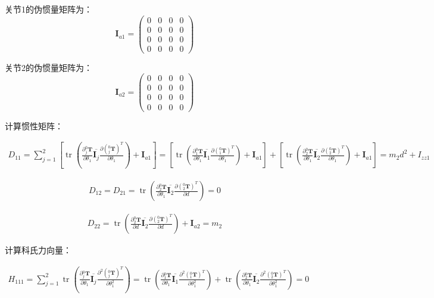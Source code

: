 \documentclass{homework}
\begin{document}
\begin{sol}
关节1的伪惯量矩阵为：
\[
  \mathbf{I}_{a1} = 
  \begin{pmatrix}
    0 & 0 & 0 & 0 \\
    0 & 0 & 0 & 0 \\
    0 & 0 & 0 & 0 \\
    0 & 0 & 0 & 0 
  \end{pmatrix}
\]

关节2的伪惯量矩阵为：
\[
  \mathbf{I}_{a2} = 
  \begin{pmatrix}
    0 & 0 & 0 & 0 \\
    0 & 0 & 0 & 0 \\
    0 & 0 & 0 & 0 \\
    0 & 0 & 0 & 0 
  \end{pmatrix}
\]

计算惯性矩阵：

\begin{align*}
  D_{11} = \sum_{j=1}^2 [\operatorname{tr} (\frac{\partial {^0_j}\mathbf{T}}{\partial \theta_1} \overline{\mathbf{I}_j} \frac{\partial ({^0_j}\mathbf{T})^T}{\partial \theta_1}) + \mathbf{I}_{a1}] 
         = [\operatorname{tr} (\frac{\partial {^0_1}\mathbf{T}}{\partial \theta_1} \overline{\mathbf{I}_1} \frac{\partial ({^0_1}\mathbf{T})^T}{\partial \theta_1}) + \mathbf{I}_{a1}] + [\operatorname{tr} (\frac{\partial {^0_2}\mathbf{T}}{\partial \theta_1} \overline{\mathbf{I}_2} \frac{\partial ({^0_2}\mathbf{T})^T}{\partial \theta_1}) + \mathbf{I}_{a1}] 
         = m_2 d^2 + I_{zz1}
\end{align*}

\begin{align*}
  D_{12} = D_{21} = \operatorname{tr} (\frac{\partial {^0_2}\mathbf{T}}{\partial \theta_1} \overline{\mathbf{I}_2} \frac{\partial ({^0_2}\mathbf{T})^T}{\partial d}) 
                  = 0
\end{align*}

\begin{align*}
  D_{22} = \operatorname{tr} (\frac{\partial {^0_2}\mathbf{T}}{\partial d} \overline{\mathbf{I}_2} \frac{\partial ({^0_2}\mathbf{T})^T}{\partial d}) + \mathbf{I}_{a2} 
         = m_2
\end{align*}

计算科氏力向量：

\begin{align*}
  H_{111} = \sum_{j=1}^2 \operatorname{tr} (\frac{\partial {^0_j}\mathbf{T}}{\partial \theta_1} \overline{\mathbf{I}_j} \frac{\partial^2 ({^0_j}\mathbf{T})^T}{\partial \theta_1^2}) 
          = \operatorname{tr} (\frac{\partial {^0_1}\mathbf{T}}{\partial \theta_1} \overline{\mathbf{I}_1} \frac{\partial^2 ({^0_1}\mathbf{T})^T}{\partial \theta_1^2}) + \operatorname{tr} (\frac{\partial {^0_2}\mathbf{T}}{\partial \theta_1} \overline{\mathbf{I}_2} \frac{\partial^2 ({^0_2}\mathbf{T})^T}{\partial \theta_1^2}) 
          = 0
\end{align*}


\end{sol}
\end{document}
